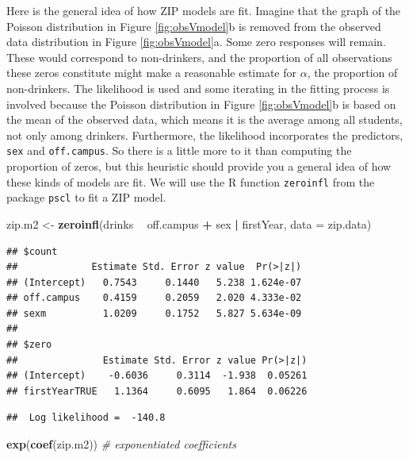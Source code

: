 \documentclass[
]{krantz}
\newenvironment{Shaded}{\begin{snugshade}}{\end{snugshade}}
\newcommand{\CommentTok}[1]{\textcolor[rgb]{0.37,0.37,0.37}{\textit{#1}}}
\newcommand{\DataTypeTok}[1]{\textcolor[rgb]{0.27,0.27,0.27}{#1}}
\newcommand{\KeywordTok}[1]{\textcolor[rgb]{0.27,0.27,0.27}{\textbf{#1}}}
\newcommand{\NormalTok}[1]{#1}
\newcommand{\OperatorTok}[1]{\textcolor[rgb]{0.43,0.43,0.43}{\textbf{#1}}}
\newcommand{\StringTok}[1]{\textcolor[rgb]{0.5,0.5,0.5}{#1}}
\begin{document}
Here is the general idea of how ZIP models are fit. Imagine that the graph of the Poisson distribution in Figure \ref{fig:obsVmodel}b is removed from the observed data distribution in Figure \ref{fig:obsVmodel}a. Some zero responses will remain. These would correspond to non-drinkers, and the proportion of all observations these zeros constitute might make a reasonable estimate for \(\alpha\), the proportion of non-drinkers. The likelihood is used and some iterating in the fitting process is involved because the Poisson distribution in Figure \ref{fig:obsVmodel}b is based on the mean of the observed data, which means it is the average among all students, not only among drinkers. Furthermore, the likelihood incorporates the predictors, \texttt{sex} and \texttt{off.campus}. So there is a little more to it than computing the proportion of zeros, but this heuristic should provide you a general idea of how these kinds of models are fit. We will use the R function \texttt{zeroinfl} from the package \texttt{pscl} to fit a ZIP model.

\begin{Shaded}
\begin{Highlighting}[]
\NormalTok{zip.m2 <-}\StringTok{ }\KeywordTok{zeroinfl}\NormalTok{(drinks }\OperatorTok{~}\StringTok{ }\NormalTok{off.campus }\OperatorTok{+}\StringTok{ }\NormalTok{sex }\OperatorTok{|}\StringTok{ }\NormalTok{firstYear, }
                   \DataTypeTok{data =}\NormalTok{ zip.data)}
\end{Highlighting}
\end{Shaded}

\begin{verbatim}
## $count
##             Estimate Std. Error z value  Pr(>|z|)
## (Intercept)   0.7543     0.1440   5.238 1.624e-07
## off.campus    0.4159     0.2059   2.020 4.333e-02
## sexm          1.0209     0.1752   5.827 5.634e-09
## 
## $zero
##               Estimate Std. Error z value Pr(>|z|)
## (Intercept)    -0.6036     0.3114  -1.938  0.05261
## firstYearTRUE   1.1364     0.6095   1.864  0.06226
\end{verbatim}

\begin{verbatim}
##  Log likelihood =  -140.8
\end{verbatim}

\begin{Shaded}
\begin{Highlighting}[]
\KeywordTok{exp}\NormalTok{(}\KeywordTok{coef}\NormalTok{(zip.m2))   }\CommentTok{# exponentiated coefficients}
\end{Highlighting}
\end{Shaded}
\end{document}
